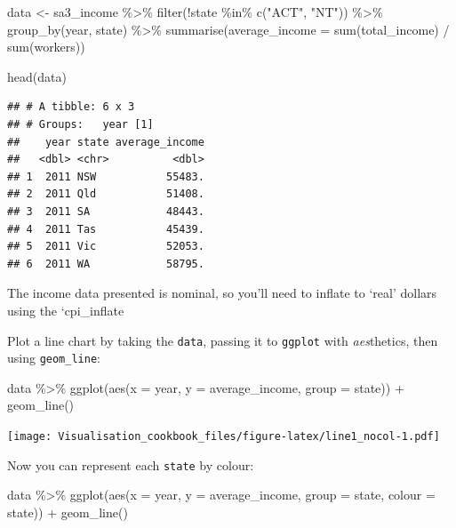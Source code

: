 \documentclass[
]{book}
\newenvironment{Shaded}{\begin{snugshade}}{\end{snugshade}}
\newcommand{\AttributeTok}[1]{\textcolor[rgb]{0.77,0.63,0.00}{#1}}
\newcommand{\FunctionTok}[1]{\textcolor[rgb]{0.00,0.00,0.00}{#1}}
\newcommand{\NormalTok}[1]{#1}
\newcommand{\OtherTok}[1]{\textcolor[rgb]{0.56,0.35,0.01}{#1}}
\newcommand{\SpecialCharTok}[1]{\textcolor[rgb]{0.00,0.00,0.00}{#1}}
\newcommand{\StringTok}[1]{\textcolor[rgb]{0.31,0.60,0.02}{#1}}
\begin{document}
\begin{Shaded}
\begin{Highlighting}[]
\NormalTok{data }\OtherTok{\textless{}{-}}\NormalTok{ sa3\_income }\SpecialCharTok{\%\textgreater{}\%} 
  \FunctionTok{filter}\NormalTok{(}\SpecialCharTok{!}\NormalTok{state }\SpecialCharTok{\%in\%} \FunctionTok{c}\NormalTok{(}\StringTok{"ACT"}\NormalTok{, }\StringTok{"NT"}\NormalTok{)) }\SpecialCharTok{\%\textgreater{}\%} 
  \FunctionTok{group\_by}\NormalTok{(year, state) }\SpecialCharTok{\%\textgreater{}\%} 
  \FunctionTok{summarise}\NormalTok{(}\AttributeTok{average\_income =} \FunctionTok{sum}\NormalTok{(total\_income) }\SpecialCharTok{/} \FunctionTok{sum}\NormalTok{(workers))}

\FunctionTok{head}\NormalTok{(data)}
\end{Highlighting}
\end{Shaded}

\begin{verbatim}
## # A tibble: 6 x 3
## # Groups:   year [1]
##    year state average_income
##   <dbl> <chr>          <dbl>
## 1  2011 NSW           55483.
## 2  2011 Qld           51408.
## 3  2011 SA            48443.
## 4  2011 Tas           45439.
## 5  2011 Vic           52053.
## 6  2011 WA            58795.
\end{verbatim}

The income data presented is nominal, so you'll need to inflate to `real' dollars using the `cpi\_inflate

Plot a line chart by taking the \texttt{data}, passing it to \texttt{ggplot} with \emph{aes}thetics, then using \texttt{geom\_line}:

\begin{Shaded}
\begin{Highlighting}[]
\NormalTok{data }\SpecialCharTok{\%\textgreater{}\%} 
  \FunctionTok{ggplot}\NormalTok{(}\FunctionTok{aes}\NormalTok{(}\AttributeTok{x =}\NormalTok{ year,}
             \AttributeTok{y =}\NormalTok{ average\_income,}
             \AttributeTok{group =}\NormalTok{ state)) }\SpecialCharTok{+} 
  \FunctionTok{geom\_line}\NormalTok{()}
\end{Highlighting}
\end{Shaded}

\texttt{[image: Visualisation\_cookbook\_files/figure-latex/line1\_nocol-1.pdf]}

Now you can represent each \texttt{state} by colour:

\begin{Shaded}
\begin{Highlighting}[]
\NormalTok{data }\SpecialCharTok{\%\textgreater{}\%} 
  \FunctionTok{ggplot}\NormalTok{(}\FunctionTok{aes}\NormalTok{(}\AttributeTok{x =}\NormalTok{ year,}
             \AttributeTok{y =}\NormalTok{ average\_income,}
             \AttributeTok{group =}\NormalTok{ state,}
             \AttributeTok{colour =}\NormalTok{ state)) }\SpecialCharTok{+} 
  \FunctionTok{geom\_line}\NormalTok{()}
\end{Highlighting}
\end{Shaded}
\end{document}
